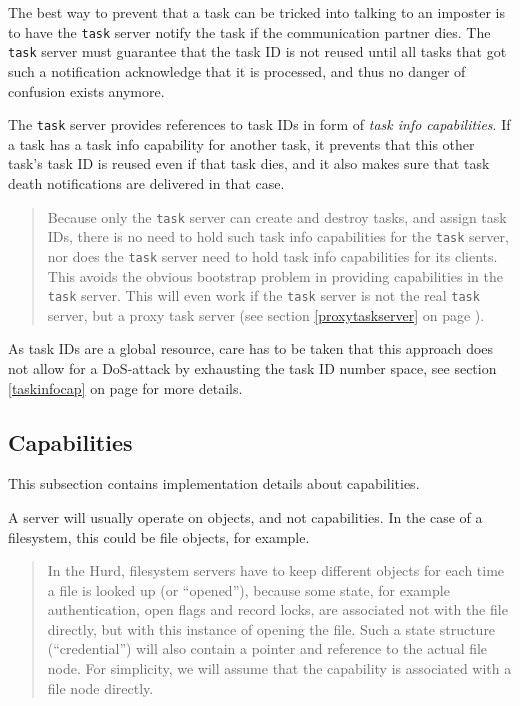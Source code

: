 \documentclass[9pt,a4paper]{extarticle}
\newenvironment{comment}{\footnotesize \begin{quote}}{\end{quote}}
\begin{document}
The best way to prevent that a task can be tricked into talking to an
imposter is to have the \texttt{task} server notify the task if the
communication partner dies.  The \texttt{task} server must guarantee
that the task ID is not reused until all tasks that got such a
notification acknowledge that it is processed, and thus no danger of
confusion exists anymore.

The \texttt{task} server provides references to task IDs in form of
\emph{task info capabilities}.  If a task has a task info capability
for another task, it prevents that this other task's task ID is reused
even if that task dies, and it also makes sure that task death
notifications are delivered in that case.

\begin{comment}
  Because only the \texttt{task} server can create and destroy tasks,
  and assign task IDs, there is no need to hold such task info
  capabilities for the \texttt{task} server, nor does the
  \texttt{task} server need to hold task info capabilities for its
  clients.  This avoids the obvious bootstrap problem in providing
  capabilities in the \texttt{task} server.  This will even work if
  the \texttt{task} server is not the real \texttt{task} server, but a
  proxy task server (see section \ref{proxytaskserver} on page
  \pageref{proxytaskserver}).
\end{comment}

As task IDs are a global resource, care has to be taken that this
approach does not allow for a DoS-attack by exhausting the task ID
number space, see section \ref{taskinfocap} on page
\pageref{taskinfocap} for more details.


\subsection{Capabilities}

This subsection contains implementation details about capabilities.

A server will usually operate on objects, and not capabilities.  In
the case of a filesystem, this could be file objects, for example.

\begin{comment}
  In the Hurd, filesystem servers have to keep different objects for
  each time a file is looked up (or ``opened''), because some state,
  for example authentication, open flags and record locks, are
  associated not with the file directly, but with this instance of
  opening the file.  Such a state structure (``credential'') will also
  contain a pointer and reference to the actual file node.  For
  simplicity, we will assume that the capability is associated with a
  file node directly.
\end{comment}
\end{document}
